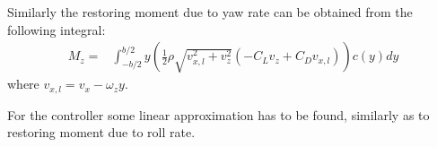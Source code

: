 Similarly the restoring moment due to yaw rate can be obtained from the following integral:
\begin{equation}\begin{split}
    M_z = 
    & \int_{-b/2}^{b/2} y \left( \frac{1}{2} \rho \sqrt{v_{x,l}^2 + v_z^2} \left( -C_L v_z + C_D v_{x,l} \right) \right) c(y) dy
\end{split}\end{equation}
where $v_{x,l} = v_x - \omega_z y$.

For the controller some linear approximation has to be found, similarly as to restoring moment due to roll rate.